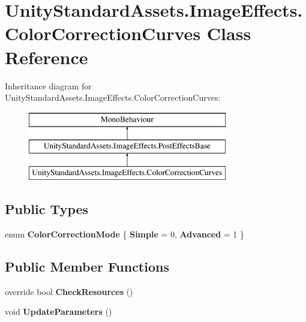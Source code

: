 \hypertarget{class_unity_standard_assets_1_1_image_effects_1_1_color_correction_curves}{}\section{Unity\+Standard\+Assets.\+Image\+Effects.\+Color\+Correction\+Curves Class Reference}
\label{class_unity_standard_assets_1_1_image_effects_1_1_color_correction_curves}
Inheritance diagram for Unity\+Standard\+Assets.\+Image\+Effects.\+Color\+Correction\+Curves\+:\begin{figure}[H]
\begin{center}
\leavevmode
\includegraphics[height=3.000000cm]{class_unity_standard_assets_1_1_image_effects_1_1_color_correction_curves}
\end{center}
\end{figure}
\subsection*{Public Types}
\begin{DoxyCompactItemize}
\item 
enum {\bfseries Color\+Correction\+Mode} \{ {\bfseries Simple} = 0, 
{\bfseries Advanced} = 1
 \}\hypertarget{class_unity_standard_assets_1_1_image_effects_1_1_color_correction_curves_a55501502c323a852330042c44d4530ad}{}\label{class_unity_standard_assets_1_1_image_effects_1_1_color_correction_curves_a55501502c323a852330042c44d4530ad}

\end{DoxyCompactItemize}
\subsection*{Public Member Functions}
\begin{DoxyCompactItemize}
\item 
override bool {\bfseries Check\+Resources} ()\hypertarget{class_unity_standard_assets_1_1_image_effects_1_1_color_correction_curves_a502331f270ce998ece3592ca9ad0c156}{}\label{class_unity_standard_assets_1_1_image_effects_1_1_color_correction_curves_a502331f270ce998ece3592ca9ad0c156}

\item 
void {\bfseries Update\+Parameters} ()\hypertarget{class_unity_standard_assets_1_1_image_effects_1_1_color_correction_curves_a0f3ebb6bb3c2db6c465e6b9701b997d4}{}\label{class_unity_standard_assets_1_1_image_effects_1_1_color_correction_curves_a0f3ebb6bb3c2db6c465e6b9701b997d4}

\end{DoxyCompactItemize}
